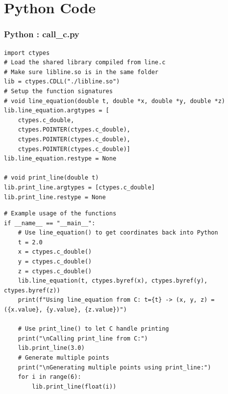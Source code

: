 \documentclass{beamer}
\theoremstyle{remark}
\numberwithin{equation}{section}
\begin{document}
\section{Python Code}
\begin{frame}[fragile]
\frametitle{Python : call\_c.py}
\begin{lstlisting}
import ctypes
# Load the shared library compiled from line.c
# Make sure libline.so is in the same folder
lib = ctypes.CDLL("./libline.so")
# Setup the function signatures
# void line_equation(double t, double *x, double *y, double *z)
lib.line_equation.argtypes = [
    ctypes.c_double,
    ctypes.POINTER(ctypes.c_double),
    ctypes.POINTER(ctypes.c_double),
    ctypes.POINTER(ctypes.c_double)]
lib.line_equation.restype = None

# void print_line(double t)
lib.print_line.argtypes = [ctypes.c_double]
lib.print_line.restype = None
\end{lstlisting}
\end{frame}
\begin{frame}[fragile]
\begin{lstlisting}
# Example usage of the functions
if __name__ == "__main__":
    # Use line_equation() to get coordinates back into Python
    t = 2.0
    x = ctypes.c_double()
    y = ctypes.c_double()
    z = ctypes.c_double()
    lib.line_equation(t, ctypes.byref(x), ctypes.byref(y), ctypes.byref(z))
    print(f"Using line_equation from C: t={t} -> (x, y, z) = ({x.value}, {y.value}, {z.value})")

    # Use print_line() to let C handle printing
    print("\nCalling print_line from C:")
    lib.print_line(3.0)
    # Generate multiple points
    print("\nGenerating multiple points using print_line:")
    for i in range(6):
        lib.print_line(float(i))
\end{lstlisting}
\end{frame}
\end{document}
